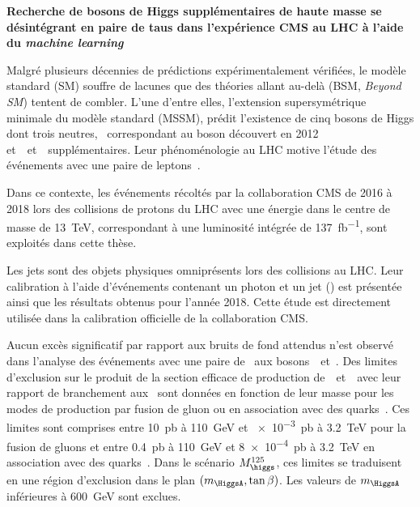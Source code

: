 \begin{center}
\LARGE
\bf
\sffamily
Recherche de bosons de Higgs supplémentaires de haute masse se désintégrant en paire de taus dans l'expérience CMS au LHC à l'aide du \emph{machine learning}
\end{center}

\vspace{2\baselineskip}

Malgré plusieurs décennies de prédictions expérimentalement vérifiées,
le modèle standard (SM) souffre de lacunes
que des théories allant au-delà (BSM, \emph{Beyond SM})
tentent de combler.
L'une d'entre elles,
l'extension supersymétrique minimale du modèle standard (MSSM),
prédit l'existence de cinq bosons de Higgs dont trois neutres,
\higgs\ correspondant au boson découvert en 2012
et~\Higgs\ et~\HiggsA\ supplémentaires.
Leur phénoménologie au LHC
motive l'étude des événements avec une paire de leptons~\tau.
\par
Dans ce contexte,
les événements récoltés par la collaboration CMS
de 2016 à 2018
lors des collisions de protons du LHC
avec une énergie dans le centre de masse de \SI{13}{\TeV},
correspondant à une luminosité intégrée de \SI{137}{\femto\barn^{-1}},
sont exploités dans cette thèse.
\par
Les jets sont des objets physiques omniprésents lors des collisions au LHC.
Leur calibration à l'aide d'événements contenant un photon et un jet (\Gjet) est présentée ainsi que les résultats obtenus pour l'année 2018.
Cette étude %
est directement utilisée dans la calibration officielle de la collaboration CMS.
\par
Aucun excès significatif par rapport aux bruits de fond attendus n'est observé
dans l'analyse des événements avec une paire de \tau\ aux bosons~\Higgs\ et~\HiggsA.
Des limites d'exclusion sur le produit de la section efficace de production de~\Higgs\ et~\HiggsA\ avec leur rapport de branchement aux \tau\ sont données
en fonction de leur masse
pour les modes de production par fusion de gluon ou en association avec des quarks~\quarkb.
Ces limites sont comprises entre
\SI{10}{\pico\barn} à \SI{110}{\GeV}
et
\SI{e-3}{\pico\barn} à \SI{3.2}{\TeV}
pour la fusion de gluons
et entre
\SI{0.4}{\pico\barn} à \SI{110}{\GeV}
et
\SI{8e-4}{\pico\barn} à \SI{3.2}{\TeV}
en association avec des quarks~\quarkb.
Dans le scénario $M_{\higgs}^{125}$,
ces limites se traduisent en une région d'exclusion dans le plan $(m_{\HiggsA},\tan\beta)$.
Les valeurs de $m_{\HiggsA}$ inférieures à \SI{600}{\GeV} sont exclues.
